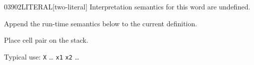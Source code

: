 \begin{worddef}{0390}{2LITERAL}[two-literal]
\interpret
	Interpretation semantics for this word are undefined.

\compile

	Append the run-time semantics below to the current definition.

\runtime

	Place cell pair  on the stack.

	\begin{rationale} %
		Typical use:
			\word{:} \texttt{X} {\ldots}
				\word{[} \texttt{x1} \texttt{x2} \word{]} 
			{\ldots} \word{;}
	\end{rationale}

	\begin{testing}
	\cbstart{}
		\\
	\cbend
	\end{testing}
\end{worddef}


